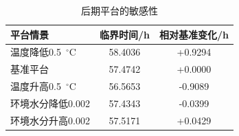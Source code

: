 \begin{table}[H]
    \centering
    \small
    \renewcommand{\arraystretch}{0.82}

    \caption{后期平台的敏感性}
    \label{tab:q3_sensitivity}

    \begin{tabular*}{0.70\textwidth}
        {@{\extracolsep{\fill}}lcc@{}}
        \toprule
        平台情景 & 临界时间/h & 相对基准变化/h \\
        \midrule
        温度降低0.5~$^\circ$C & 58.4036 & +0.9294 \\
        基准平台               & 57.4742 & +0.0000 \\
        温度升高0.5~$^\circ$C & 56.5653 & -0.9089 \\
        环境水分降低0.002     & 57.4343 & -0.0399 \\
        环境水分升高0.002     & 57.5171 & +0.0429 \\
        \bottomrule
    \end{tabular*}
\end{table}